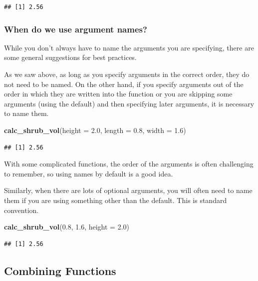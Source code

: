 \documentclass[
]{article}
\newenvironment{Shaded}{\begin{snugshade}}{\end{snugshade}}
\newcommand{\AttributeTok}[1]{\textcolor[rgb]{0.13,0.29,0.53}{#1}}
\newcommand{\FloatTok}[1]{\textcolor[rgb]{0.00,0.00,0.81}{#1}}
\newcommand{\FunctionTok}[1]{\textcolor[rgb]{0.13,0.29,0.53}{\textbf{#1}}}
\newcommand{\NormalTok}[1]{#1}
\begin{document}
\begin{verbatim}
## [1] 2.56
\end{verbatim}

\subsubsection{When do we use argument
names?}\label{when-do-we-use-argument-names}

While you don't always have to name the arguments you are specifying,
there are some general suggestions for best practices.

As we saw above, as long as you specify arguments in the correct order,
they do not need to be named. On the other hand, if you specify
arguments out of the order in which they are written into the function
or you are skipping some arguments (using the default) and then
specifying later arguments, it is necessary to name them.

\begin{Shaded}
\begin{Highlighting}[]
\FunctionTok{calc\_shrub\_vol}\NormalTok{(}\AttributeTok{height =} \FloatTok{2.0}\NormalTok{, }\AttributeTok{length =} \FloatTok{0.8}\NormalTok{, }\AttributeTok{width =} \FloatTok{1.6}\NormalTok{)}
\end{Highlighting}
\end{Shaded}

\begin{verbatim}
## [1] 2.56
\end{verbatim}

With some complicated functions, the order of the arguments is often
challenging to remember, so using names by default is a good idea.

Similarly, when there are lots of optional arguments, you will often
need to name them if you are using something other than the default.
This is standard convention.

\begin{Shaded}
\begin{Highlighting}[]
\FunctionTok{calc\_shrub\_vol}\NormalTok{(}\FloatTok{0.8}\NormalTok{, }\FloatTok{1.6}\NormalTok{, }\AttributeTok{height =} \FloatTok{2.0}\NormalTok{)}
\end{Highlighting}
\end{Shaded}

\begin{verbatim}
## [1] 2.56
\end{verbatim}

\subsection{Combining Functions}\label{combining-functions}
\end{document}
